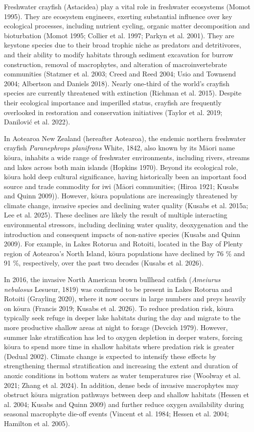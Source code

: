 \documentclass[
  12pt,
  a4paper,
]{scrbook}
\begin{document}
Freshwater crayfish (Astacidea) play a vital role in freshwater
ecosystems (Momot 1995). They are ecosystem engineers, exerting
substantial influence over key ecological processes, including nutrient
cycling, organic matter decomposition and bioturbation (Momot 1995;
Collier et al. 1997; Parkyn et al. 2001). They are keystone species due
to their broad trophic niche as predators and detritivores, and their
ability to modify habitats through sediment excavation for burrow
construction, removal of macrophytes, and alteration of
macroinvertebrate communities (Statzner et al. 2003; Creed and Reed
2004; Usio and Townsend 2004; Albertson and Daniels 2018). Nearly
one-third of the world's crayfish species are currently threatened with
extinction (Richman et al. 2015). Despite their ecological importance
and imperilled status, crayfish are frequently overlooked in restoration
and conservation initiatives (Taylor et al. 2019; Danilović et al.
2022).

In Aotearoa New Zealand (hereafter Aotearoa), the endemic northern
freshwater crayfish \emph{Paranephrops planifrons} White, 1842, also
known by its Māori name kōura, inhabits a wide range of freshwater
environments, including rivers, streams and lakes across both main
islands (Hopkins 1970). Beyond its ecological role, kōura hold deep
cultural significance, having historically been an important food source
and trade commodity for iwi (Māori communities; (Hiroa 1921; Kusabs and
Quinn 2009)). However, kōura populations are increasingly threatened by
climate change, invasive species and declining water quality (Kusabs et
al. 2015a; Lee et al. 2025). These declines are likely the result of
multiple interacting environmental stressors, including declining water
quality, deoxygenation and the introduction and consequent impacts of
non-native species (Kusabs and Quinn 2009). For example, in Lakes
Rotorua and Rotoiti, located in the Bay of Plenty region of Aotearoa's
North Island, kōura populations have declined by 76 \% and 91 \%,
respectively, over the past two decades (Kusabs et al. 2026).

In 2016, the invasive North American brown bullhead catfish
(\emph{Ameiurus nebulosus} Lesueur, 1819) was confirmed to be present in
Lakes Rotorua and Rotoiti (Grayling 2020), where it now occurs in large
numbers and preys heavily on kōura (Francis 2019; Kusabs et al. 2026).
To reduce predation risk, kōura typically seek refuge in deeper lake
habitats during the day and migrate to the more productive shallow areas
at night to forage (Devcich 1979). However, summer lake stratification
has led to oxygen depletion in deeper waters, forcing kōura to spend
more time in shallow habitats where predation risk is greater (Dedual
2002). Climate change is expected to intensify these effects by
strengthening thermal stratification and increasing the extent and
duration of anoxic conditions in bottom waters as water temperatures
rise (Woolway et al. 2021; Zhang et al. 2024). In addition, dense beds
of invasive macrophytes may obstruct kōura migration pathways between
deep and shallow habitats (Hessen et al. 2004; Kusabs and Quinn 2009)
and further reduce oxygen availability during seasonal macrophyte
die-off events (Vincent et al. 1984; Hessen et al. 2004; Hamilton et al.
2005).
\end{document}
